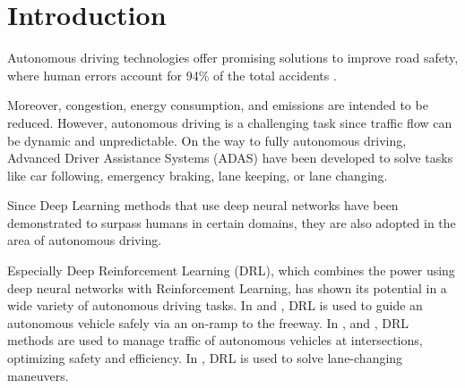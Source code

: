 \documentclass[review]{elsarticle}
\providecommand{\martinc}[1]{}                  %
\providecommand{\3}{{\ss}}
\begin{document}
	\section{Introduction}
	Autonomous driving technologies offer promising solutions to
	improve road safety, where human errors account for 94\% of the total
	accidents \citep{vehicleCrashSurvey2015}.  
	\martinc{Das ``author'' Attribut in Bibtex darf man nicht
		fuer anderes missbrauchen, da je nach Zitierstil nur zwei Autoren
		drankommen und bibtex diverse andere Manipulationen vornimmt; .bib
		File korrigiert.}
	\martinc{citep=cite with parentheses}
	Moreover, congestion, energy
	consumption, and emissions \martinc{Die Englaender haben bei
		Aufzaehlungen von $\ge 3$ items auch vor dem ``and'' ein Komma} are intended to be reduced. 
	However, autonomous driving is a challenging task
	since traffic flow can be dynamic and unpredictable.
	On the way to fully autonomous driving, Advanced Driver Assistance Systems
	(ADAS) have been developed to solve tasks like car following, emergency
	braking, lane keeping, or lane changing. \martinc{``like'' startet
		bereits eine unvollst\"andige Aufz\"ahlung, so no need for ``etc.''}
	\martinc{Bindestriche in zusammengesetzten Worten gibt es i.A. nur bei 
		$\ge 3$ Teilen, und zwar in alle L\"ucken au\3er der letzten, also
		\emph{lane changing} aber \emph{lane-changing model}}
	Since Deep Learning methods that use deep neural networks have been demonstrated to surpass humans
	in certain domains, they are also adopted in the area of autonomous
	driving.
	\martinc{Generelles ueber which vs. that: 
		1. \emph{which mit Komma:}
		``non-defining clauses'': der darauf folgende Relativsatz gibt interessante Details,
		schraenkt das Subjekt/Objekt im Hauptsatz aber nicht ein (I use my bike, which has 18
		gears, rather often)
		2. \emph{which ohne Komma oder besser ``that'' oder ein Gerund (``ing-Form''):} ``defining clauses''. Der darauf folgende Relativsatz enthaelt einschraenkende,
		wesentliche Informationen: ``The bike that/which has a
		broken chain/having a broken chain is in the garage'' (impliziert,
		dass ich mindestens ein zweites Rad habe). Im Folgenden ist eine ``nice-to
		mention''-Definition, also ist which mit Komma OK, oft folgen bei dir dann
		aber defining clauses, die ich durch ``that'', ``who'' (bei Menschen)
		oder einem Gerund ersetzt habe. Pedantische Korrewktoren nennen das
		auch ``which hunting'' (witch=Hexe)}
	Especially Deep Reinforcement Learning (DRL), which combines the power
	using deep neural networks with Reinforcement Learning, has shown its potential in a wide variety of autonomous driving tasks. 
	In \cite{OnRampMerge2018} and \cite{OnRampMerge2020}, DRL is used to
	guide an autonomous vehicle safely via an on-ramp to the freeway. In \cite{intersection1}, \cite{intersection3} and \cite{intersection2}, DRL methods are used to manage traffic of autonomous vehicles at intersections, optimizing safety and efficiency.
	In \cite{LangeChange1}, DRL is used to solve lane-changing maneuvers.
	
\end{document}

